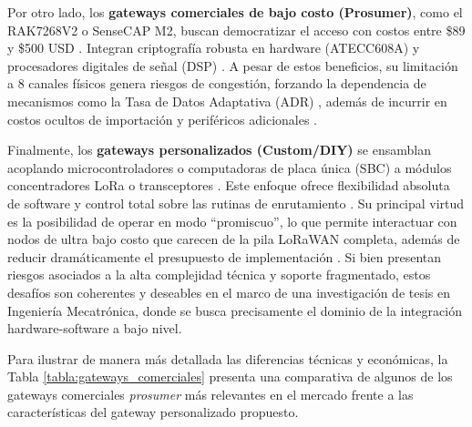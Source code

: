 Por otro lado, los \textbf{gateways comerciales de bajo costo (Prosumer)}, como el RAK7268V2 o SenseCAP M2, buscan democratizar el acceso con costos entre \$89 y \$500 USD \cite{nb_gateway_commercial_6}. Integran criptografía robusta en hardware (ATECC608A) y procesadores digitales de señal (DSP) \cite{nb_gateway_prosumer_29}. A pesar de estos beneficios, su limitación a 8 canales físicos genera riesgos de congestión, forzando la dependencia de mecanismos como la Tasa de Datos Adaptativa (ADR) \cite{nb_gateway_prosumer_32, nb_gateway_prosumer_34}, además de incurrir en costos ocultos de importación y periféricos adicionales \cite{nb_gateway_prosumer_41}.

Finalmente, los \textbf{gateways personalizados (Custom/DIY)} se ensamblan acoplando microcontroladores o computadoras de placa única (SBC) a módulos concentradores LoRa o transceptores \cite{nb_gateway_custom_9}. Este enfoque ofrece flexibilidad absoluta de software y control total sobre las rutinas de enrutamiento \cite{nb_gateway_custom_7}. Su principal virtud es la posibilidad de operar en modo ``promiscuo'', lo que permite interactuar con nodos de ultra bajo costo que carecen de la pila LoRaWAN completa, además de reducir dramáticamente el presupuesto de implementación \cite{nb_gateway_custom_10}. Si bien presentan riesgos asociados a la alta complejidad técnica y soporte fragmentado, estos desafíos son coherentes y deseables en el marco de una investigación de tesis en Ingeniería Mecatrónica, donde se busca precisamente el dominio de la integración hardware-software a bajo nivel.

Para ilustrar de manera más detallada las diferencias técnicas y económicas, la Tabla \ref{tabla:gateways_comerciales} presenta una comparativa de algunos de los gateways comerciales \textit{prosumer} más relevantes en el mercado frente a las características del gateway personalizado propuesto.

